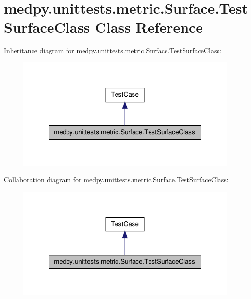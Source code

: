 \hypertarget{classmedpy_1_1unittests_1_1metric_1_1Surface_1_1TestSurfaceClass}{
\section{medpy.unittests.metric.Surface.TestSurfaceClass Class Reference}
\label{classmedpy_1_1unittests_1_1metric_1_1Surface_1_1TestSurfaceClass}
}


Inheritance diagram for medpy.unittests.metric.Surface.TestSurfaceClass:\nopagebreak
\begin{figure}[H]
\begin{center}
\leavevmode
\includegraphics[width=314pt]{classmedpy_1_1unittests_1_1metric_1_1Surface_1_1TestSurfaceClass__inherit__graph}
\end{center}
\end{figure}


Collaboration diagram for medpy.unittests.metric.Surface.TestSurfaceClass:\nopagebreak
\begin{figure}[H]
\begin{center}
\leavevmode
\includegraphics[width=314pt]{classmedpy_1_1unittests_1_1metric_1_1Surface_1_1TestSurfaceClass__coll__graph}
\end{center}
\end{figure}
